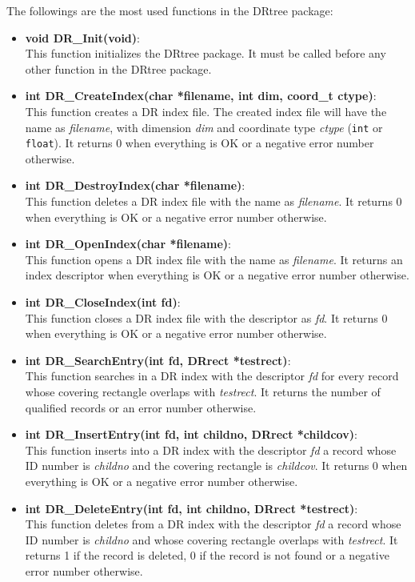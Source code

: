 
The followings are the most used functions in the DRtree package:
\begin{itemize}
	\item
	{\bf void DR\_Init(void)}:\\
	This function initializes the DRtree package. It must be called before
	any other function in the DRtree package.

	\item
	{\bf int DR\_CreateIndex(char *filename, int dim, coord\_t ctype)}:\\
	This function creates a DR index file. The created index file will have
	the name as {\em filename}, with dimension {\em dim} and coordinate type
	{\em ctype} ({\tt int} or {\tt float}).
	It returns 0 when everything is OK or a negative error number otherwise.

	\item
	{\bf int DR\_DestroyIndex(char *filename)}:\\
	This function deletes a DR index file with the name as {\em filename}.
	It returns 0 when everything is OK or a negative error number otherwise.

	\item
	{\bf int DR\_OpenIndex(char *filename)}:\\
	This function opens a DR index file with the name as {\em filename}.
	It returns an index descriptor when everything is OK or a
	negative error number otherwise.

	\item
	{\bf int DR\_CloseIndex(int fd)}:\\
	This function closes a DR index file with the descriptor as {\em fd}.
	It returns 0 when everything is OK or a negative error number otherwise.

	\item
	{\bf int DR\_SearchEntry(int fd, DRrect *testrect)}:\\
	This function searches in a DR index with the descriptor {\em fd} for
	every record whose covering rectangle overlaps with {\em testrect}.
	It returns the number of qualified records or an error number otherwise.

	\item
	{\bf int DR\_InsertEntry(int fd, int childno, DRrect *childcov)}:\\
	This function inserts into a DR index with the descriptor {\em fd} a
	record whose ID number is {\em childno} and the covering rectangle
	is {\em childcov}.
	It returns 0 when everything is OK or a negative error number otherwise.

	\item
	{\bf int DR\_DeleteEntry(int fd, int childno, DRrect *testrect)}:\\
	This function deletes from a DR index with the descriptor {\em fd} a
	record whose ID number is {\em childno} and whose covering rectangle
	overlaps with {\em testrect}. It returns 1 if the record is deleted, 0
	if the record is not found or a negative error number otherwise.

\end{itemize}

